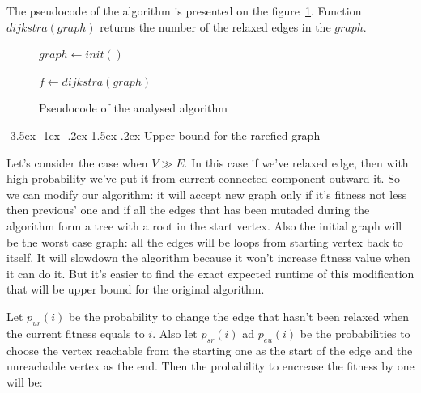 \documentclass[a4paper,10pt]{article}
\makeatletter
\theoremstyle{definition}
\renewcommand\section{\@startsection {section}{1}{\z@}%
                                   {-3.5ex \@plus -1ex \@minus -.2ex}%
                                   {1.5ex \@plus.2ex}%
                                   {\large\bfseries}}
\makeatother
\begin{document}
The pseudocode of the algorithm is presented on the figure~\ref{pseudocode}. Function $dijkstra(graph)$ returns the number of the relaxed edges in the $graph$.

\begin{figure}[ht]
\label{pseudocode}
\begin{center}
\begin{algorithm}[H]
  
  $graph \gets init()$
  
  $f \gets dijkstra(graph)$
  
  \end{algorithm}
  \caption{Pseudocode of the analysed algorithm}
 \end{center}
\end{figure}

\section{Upper bound for the rarefied graph}
\label{sec:3}

Let's consider the case when $V \gg E$. In this case if we've relaxed edge, then with high probability we've put it from current connected component outward it. So we can modify our algorithm: it will accept new graph only if it's fitness not less then previous' one and if all the edges that has been mutaded during the algorithm form a tree with a root in the start vertex. Also the initial graph will be the worst case graph: all the edges will be loops from starting vertex back to itself. It will slowdown the algorithm because it won't increase fitness value when it can do it. But it's easier to find the exact expected runtime of this modification that will be upper bound for the original algorithm.

Let $p_{ur}(i)$ be the probability to change the edge that hasn't been relaxed when the current fitness equals to $i$. Also let $p_{sr}(i)$ ad $p_{eu}(i)$ be the probabilities to choose the vertex reachable from the starting one as the start of the edge and the unreachable vertex as the end.
 Then the probability to encrease the fitness by one will be:
 
\end{document}
